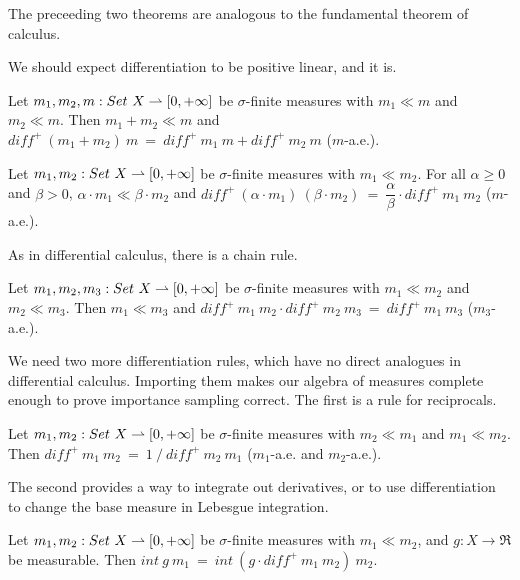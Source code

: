 The preceeding two theorems are analogous to the fundamental theorem of calculus.

We should expect differentiation to be positive linear, and it is.

\begin{lemma}
\label{lem:diff-distributes-over-addition}
Let $m_1,m_2,m : Set~X \rightharpoonup [0,+\infty]$ be $\sigma$-finite measures with $m_1 \ll m$ and $m_2 \ll m$.
Then $m_1 + m_2 \ll m$ and $diff^+~(m_1 + m_2)~m\ =\ diff^+~m_1~m + diff^+~m_2~m$ ($m$-a.e.).
\end{lemma}

\begin{lemma}
\label{lem:diff-distributes-over-scaling}
Let $m_1,m_2 : Set~X \rightharpoonup [0,+\infty]$ be $\sigma$-finite measures with $m_1 \ll m_2$.
For all $\alpha \ge 0$ and $\beta > 0$, $\alpha \cdot m_1 \ll \beta \cdot m_2$ and $diff^+~(\alpha \cdot m_1)~(\beta \cdot m_2)\ =\ \dfrac{\alpha}{\beta} \cdot diff^+~m_1~m_2$ ($m$-a.e.).
\end{lemma}

As in differential calculus, there is a chain rule.

\begin{lemma}
\label{lem:diff-chain-rule}
Let $m_1,m_2,m_3 : Set~X \rightharpoonup [0,+\infty]$ be $\sigma$-finite measures with $m_1 \ll m_2$ and $m_2 \ll m_3$.
Then $m_1 \ll m_3$ and $diff^+~m_1~m_2 \cdot diff^+~m_2~m_3\ =\ diff^+~m_1~m_3$ ($m_3$-a.e.).
\end{lemma}

We need two more differentiation rules, which have no direct analogues in differential calculus.
Importing them makes our algebra of measures complete enough to prove importance sampling correct.
The first is a rule for reciprocals.

\begin{lemma}
\label{lem:diff-reciprocal-rule}
Let $m_1,m_2 : Set~X \rightharpoonup [0,+\infty]$ be $\sigma$-finite measures with $m_2 \ll m_1$ and $m_1 \ll m_2$.
Then $diff^+~m_1~m_2\ =\ 1~{/}~diff^+~m_2~m_1$ ($m_1$-a.e. and $m_2$-a.e.).
\end{lemma}

The second provides a way to integrate out derivatives, or to use differentiation to change the base measure in Lebesgue integration.

\begin{lemma}
\label{lem:diff-change-measure}
Let $m_1,m_2 : Set~X \rightharpoonup [0,+\infty]$ be $\sigma$-finite measures with $m_1 \ll m_2$, and $g : X \to \Re$ be measurable.
Then $int~g~m_1\ =\ int~(g \cdot diff^+~m_1~m_2)~m_2$.
\end{lemma}

